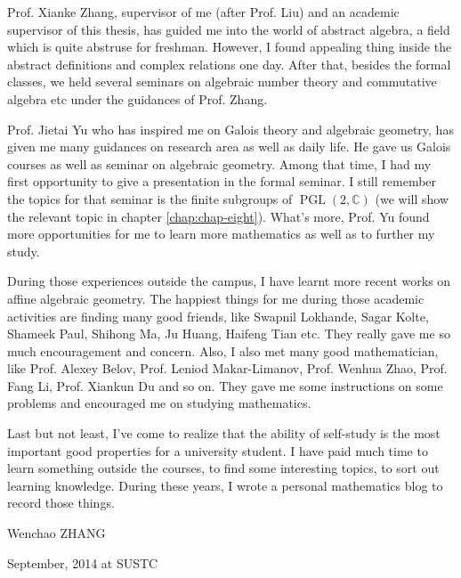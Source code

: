 Prof. Xianke Zhang, supervisor of me (after Prof. Liu) and an academic supervisor of this thesis, has guided me into the world of abstract algebra, a field which is quite abstruse for freshman. However, I found appealing thing inside the abstract definitions and complex relations one day. After that, besides the formal classes, we held several seminars on algebraic number theory and commutative algebra etc under the guidances of Prof. Zhang. 

Prof. Jietai Yu who has inspired me on Galois theory and algebraic geometry, has given me many guidances on research area as well as daily life. He gave us Galois courses as well as seminar on algebraic geometry. Among that time, I had my first opportunity to give a presentation in the formal seminar. I still remember the topics for that seminar is the finite subgroups of $\operatorname{PGL}(2,\mathbb{C})$ (we will show the relevant topic in chapter \ref{chap:chap-eight}). What's more, Prof. Yu found more opportunities for me to learn more mathematics as well as to further my study.

During those experiences outside the campus, I have learnt more recent works on affine algebraic geometry. The happiest things for me during those academic activities are finding many good friends, like Swapnil Lokhande, Sagar Kolte, Shameek Paul, Shihong Ma, Ju Huang, Haifeng Tian etc. They really gave me so much encouragement and concern. Also, I also met many good mathematician, like Prof. Alexey Belov, Prof. Leniod Makar-Limanov, Prof. Wenhua Zhao, Prof. Fang Li, Prof. Xiankun Du and so on. They gave me some instructions on some problems and encouraged me on studying mathematics.

Last but not least, I've come to realize that the ability of self-study is the most important good properties for a university student. I have paid much time to learn something outside the courses, to find some interesting topics, to sort out learning knowledge. During these years, I wrote a personal mathematics blog to record those things.


\vskip 28pt

\begin{flushright}

Wenchao ZHANG

September, 2014 at SUSTC

\end{flushright}






     